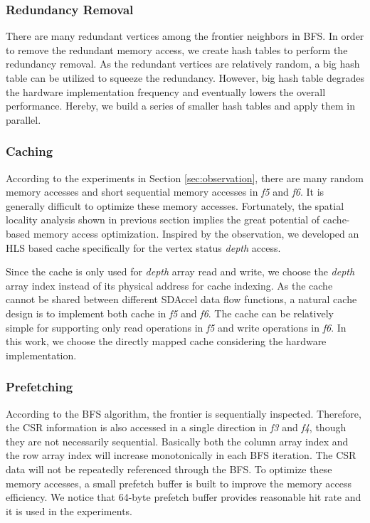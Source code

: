 \subsubsection{Redundancy Removal}
There are many redundant vertices among the frontier neighbors in BFS. 
In order to remove the redundant memory access, we create hash tables 
to perform the redundancy removal. As the redundant vertices are 
relatively random, a big hash table can be utilized to squeeze 
the redundancy. However, big hash table degrades the hardware implementation 
frequency and eventually lowers the overall performance. Hereby, we 
build a series of smaller hash tables and apply them in parallel. 

\subsubsection{Caching}
According to the experiments in Section \ref{sec:observation}, 
there are many random memory accesses and short 
sequential memory accesses in \textit{f5} and \textit{f6}. 
It is generally difficult to optimize these memory accesses. Fortunately, 
the spatial locality analysis shown in previous section 
implies the great potential of cache-based memory access optimization. 
Inspired by the observation, we developed an HLS based cache specifically 
for the vertex status \textit{depth} access. 

Since the cache is only used for \textit{depth} array read and write, we  
choose the \textit{depth} array index instead of its physical address for cache 
indexing. As the cache cannot be shared 
between different SDAccel data flow functions, a natural cache design is 
to implement both cache in \textit{f5} and \textit{f6}. The cache can be relatively simple 
for supporting only read operations in \textit{f5} and write operations in \textit{f6}.  
In this work, we choose the directly mapped cache considering the hardware implementation.  

\subsubsection{Prefetching}
According to the BFS algorithm, the frontier is sequentially inspected. 
Therefore, the CSR information is also accessed in a single direction 
in \textit{f3} and \textit{f4}, though they are not necessarily sequential. Basically 
both the column array index and the row array index will increase 
monotonically in each BFS iteration. The CSR data will not be repeatedly 
referenced through the BFS. To optimize these memory 
accesses, a small prefetch buffer is built to improve the memory access efficiency. 
We notice that 64-byte prefetch buffer provides reasonable hit rate and 
it is used in the experiments.

